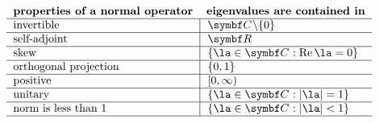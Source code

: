 \[
\begin{tabular}{ll}
\textbf{properties of a normal operator}
& \textbf{eigenvalues are contained in}\\ \hline
 invertible
&\hspace*{-6bp}\vline\ \ $\C{} \sm \br{0}$ \\ \hline
self-adjoint
&\hspace*{-6bp}\vline\ \ $\R{}$\\ \hline
skew
&\hspace*{-6bp}\vline\ \ $\br{\la \in \C{}: \re \la = 0}$\\ \hline
 orthogonal projection
&\hspace*{-6bp}\vline\ \ $\br{0, 1}$\\ \hline
positive
&\hspace*{-6bp}\vline\ \ $[0, \infty)$ \\ \hline
unitary
&\hspace*{-6bp}\vline\ \ $\br{\la \in \C{}: \abs{\la} = 1}$\\ \hline
norm is less than $1$
&\hspace*{-6bp}\vline\ \ $\br{\la \in \C{}: \abs{\la} < 1}$\\ \hline
\end{tabular}
\]

